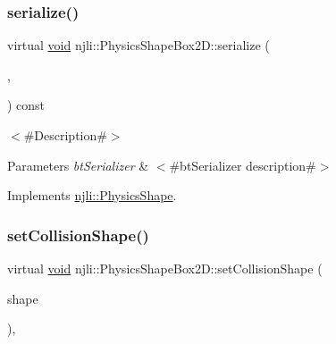 \mbox{\label{classnjli_1_1_physics_shape_box2_d_ad3f806a86d7db579cd7d43f4e8f41ace}} 
\subsubsection{\texorpdfstring{serialize()}{serialize()}}
{\footnotesize\ttfamily virtual \mbox{\hyperlink{_thread_8h_af1e856da2e658414cb2456cb6f7ebc66}{void}} njli\+::\+Physics\+Shape\+Box2\+D\+::serialize (\begin{DoxyParamCaption}\item[{\mbox{\hyperlink{_thread_8h_af1e856da2e658414cb2456cb6f7ebc66}{void}} $\ast$}]{,  }\item[{bt\+Serializer $\ast$}]{ }\end{DoxyParamCaption}) const\hspace{0.3cm}{\ttfamily [virtual]}}

$<$\#\+Description\#$>$


\begin{DoxyParams}{Parameters}
{\em bt\+Serializer} & $<$\#bt\+Serializer description\#$>$ \\
\hline
\end{DoxyParams}


Implements \mbox{\hyperlink{classnjli_1_1_physics_shape_a2ac8a109a5ad67ee79f40ce8f28337cf}{njli\+::\+Physics\+Shape}}.

\mbox{\label{classnjli_1_1_physics_shape_box2_d_a5948eb2b64291b9ad1e1ce711326b5c6}} 
\subsubsection{\texorpdfstring{set\+Collision\+Shape()}{setCollisionShape()}}
{\footnotesize\ttfamily virtual \mbox{\hyperlink{_thread_8h_af1e856da2e658414cb2456cb6f7ebc66}{void}} njli\+::\+Physics\+Shape\+Box2\+D\+::set\+Collision\+Shape (\begin{DoxyParamCaption}\item[{const bt\+Collision\+Shape \&}]{shape }\end{DoxyParamCaption})\hspace{0.3cm}{\ttfamily [protected]}, {\ttfamily [virtual]}}



